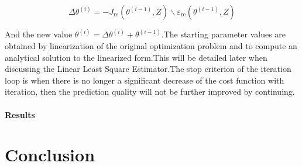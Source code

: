 \documentclass[a4paper,12pt]{article}
\numberwithin{equation}{section}
\begin{document}
$$
\Delta \theta^{(i)}=-J_{\mathrm{re}}\left(\theta^{(i-1)}, Z\right) \backslash \varepsilon_{\mathrm{re}}\left(\theta^{(i-1)}, Z\right)
$$

\noindent
And the new value $\theta^{(i)}=\Delta \theta^{(i)} + \theta^{(i-1)} $.The starting parameter values are obtained by linearization of the original optimization problem and to compute an analytical solution to the linearized form.This will be detailed later when discussing the Linear Least Square Estimator.The stop criterion of the iteration loop is when there is no longer a significant decrease of the cost function with iteration, then the prediction quality will not be further improved by continuing.

\paragraph{Results}

\newpage
\section{Conclusion}
\end{document}
